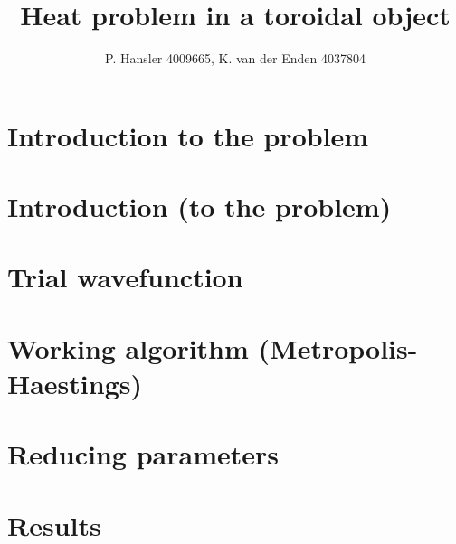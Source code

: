 \documentclass{article}
\begin{document}
\title{Heat problem in a toroidal object}
\author{P. Hansler 4009665, K. van der Enden 4037804}
\maketitle
\newpage
\tableofcontents
\newpage
\section{Introduction to the problem}


\section{Introduction (to the problem)}
\section{Trial wavefunction}
\section{Working algorithm (Metropolis-Haestings)}
\section{Reducing parameters}
\section{Results}
\newpage
%
\newpage
%
\newpage
%
\newpage

\end{document}
